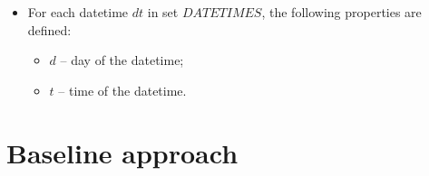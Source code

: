 \documentclass{article}
\begin{document}
\begin{itemize}
    \item For each datetime $dt$ in set $DATETIMES$, the following properties are defined:
    \begin{itemize}
        \setlength\itemsep{0.05em}
        \item $d$ -- day of the datetime;
        \item $t$ -- time of the datetime.
    \end{itemize}

\end{itemize}

\section{Baseline approach}





\end{document}
